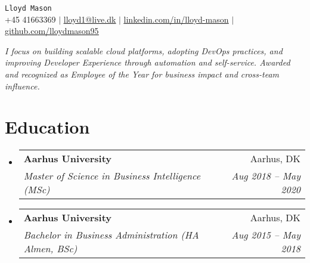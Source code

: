 \documentclass[letterpaper,11pt]{article}
\makeatletter
\newcommand{\resumeSubheading}[4]{
  \vspace{-2pt}\item
    \begin{tabular*}{0.97\textwidth}[t]{l@{\extracolsep{\fill}}r}
      \textbf{#1} & #2 \\
      \textit{\small#3} & \textit{\small #4} \\
    \end{tabular*}\vspace{-7pt}
}
\newcommand{\resumeSubHeadingListStart}{\begin{itemize}[leftmargin=0.15in, label={}]}
\newcommand{\resumeSubHeadingListEnd}{\end{itemize}}
\makeatother
\begin{document}
\begin{center}
    {\Huge \texttt{Lloyd Mason}} \\ \vspace{1pt}
    \small +45 41663369 $|$ \href{mailto:lloyd1@live.dk}{\underline{lloyd1@live.dk}} $|$ 
    \href{https://linkedin.coProven track m/in/lloyd-mason}{\underline{linkedin.com/in/lloyd-mason}} $|$
    \href{https://github.com/lloydmason95}{\underline{github.com/lloydmason95}}
\end{center}

\vspace{5pt}
\begin{center}
    \small \textit{I focus on building scalable cloud platforms, adopting DevOps practices, and improving Developer Experience through automation and self-service. Awarded and recognized as Employee of the Year for business impact and cross-team influence.}
\end{center}
\vspace{5pt}

\section{Education}
  \resumeSubHeadingListStart
    \resumeSubheading
      {Aarhus University}{Aarhus, DK}
      {Master of Science in Business Intelligence (MSc)}{Aug 2018 -- May 2020}
    \resumeSubheading
      {Aarhus University}{Aarhus, DK}
      {Bachelor in Business Administration (HA Almen, BSc)}{Aug 2015 -- May 2018}
  \resumeSubHeadingListEnd

\end{document}
